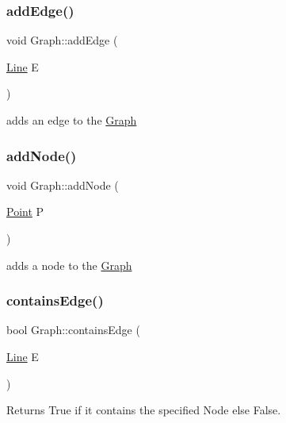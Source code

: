 \subsubsection{\texorpdfstring{add\+Edge()}{addEdge()}}
{\footnotesize\ttfamily void Graph\+::add\+Edge (\begin{DoxyParamCaption}\item[{\mbox{\hyperlink{class_line}{Line}}}]{E }\end{DoxyParamCaption})}



adds an edge to the \mbox{\hyperlink{class_graph}{Graph}} 

\mbox{\label{class_graph_aaf5ccb68d053bd64b6b057783c99608c}} 
\subsubsection{\texorpdfstring{add\+Node()}{addNode()}}
{\footnotesize\ttfamily void Graph\+::add\+Node (\begin{DoxyParamCaption}\item[{\mbox{\hyperlink{class_point}{Point}}}]{P }\end{DoxyParamCaption})}



adds a node to the \mbox{\hyperlink{class_graph}{Graph}} 

\mbox{\label{class_graph_af7eefeaacac324886fa73f3a2e85f20a}} 
\subsubsection{\texorpdfstring{contains\+Edge()}{containsEdge()}}
{\footnotesize\ttfamily bool Graph\+::contains\+Edge (\begin{DoxyParamCaption}\item[{\mbox{\hyperlink{class_line}{Line}}}]{E }\end{DoxyParamCaption})}



Returns True if it contains the specified Node else False. 

\mbox{\label{class_graph_ae807fc072ac3e93c9718ee326a0d0822}} 
